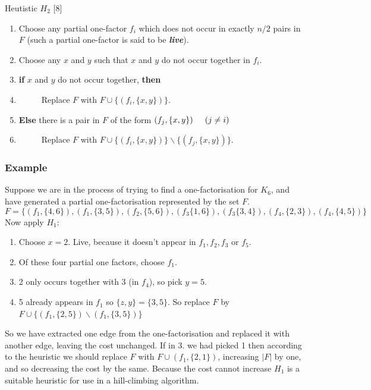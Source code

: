 \documentclass[
  12pt,
  a4paper]{book}
\begin{document}
Heutistic \(H_2\) {[}8{]}

\begin{enumerate}
\def\labelenumi{\arabic{enumi}.}
\item
  Choose any partial one-factor \(f_i\) which does not occur in exactly
  \(n/2\) pairs in \(F\) (such a partial one-factor is said to be
  \textbf{\emph{live}}).
\item
  Choose any \(x\) and \(y\) such that \(x\) and \(y\) do not occur together
  in \(f_i\).
\item
  \textbf{if} \(x\) and \(y\) do not occur together, \textbf{then}
\item
  \(\hspace{1cm}\) Replace \(F\) with \(F \cup \{(f_i,\{x,y\})\}\).
\item
  \textbf{Else} there is a pair in \(F\) of the form
  \((f_j,\{x,y\}) \hspace{0.5cm} (j \neq i)\)
\item
  \(\hspace{1cm}\) Replace \(F\) with \(F \cup \{(f_i,\{x,y\})\} \backslash  \{(f_j,\{x,y\})\}\).
\end{enumerate}

\hypertarget{example-1}{%
\subsubsection{Example}\label{example-1}}

Suppose we are in the process of trying to find a one-factorisation for
\(K_6\), and have generated a partial one-factorisation represented by the
set \(F\).
\[F=\{(f_1,\{4,6\}),(f_1,\{3,5\}),(f_2,\{5,6\}),(f_3\{1,6\}), (f_3\{3,4\}),(f_4,\{2,3\}),(f_4,\{4,5\})\}\]
Now apply \(H_1\):

\begin{enumerate}
\def\labelenumi{\arabic{enumi}.}
\item
  Choose \(x=2\). Live, because it doesn't appear in \(f_1,f_2,f_3\) or
  \(f_5\).
\item
  Of these four partial one factors, choose \(f_1\).
\item
  2 only occurs together with 3 (in \(f_4\)), so pick \(y=5\).
\item
  5 already appears in \(f_1\) so \(\{z,y\}=\{3,5\}\). So replace \(F\) by
  \(F \cup \{(f_1,\{2,5\}) \backslash (f_1,\{3,5\})\}\)
\end{enumerate}

So we have extracted one edge from the one-factorisation and replaced it
with another edge, leaving the cost unchanged.
If in 3. we had picked 1 then according to the heuristic we should
replace \(F\) with \(F \cup (f_1,\{2,1\})\), increasing \(|F|\) by one, and so
decreasing the cost by the same. Because the cost cannot increase \(H_1\)
is a suitable heuristic for use in a hill-climbing algorithm.
\end{document}
